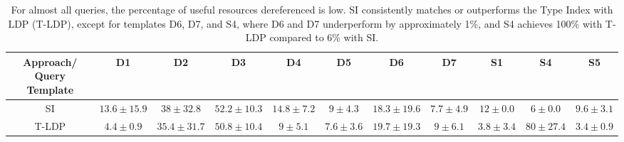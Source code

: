 \begin{table}[htbp]
	\begin{center}
		\begin{tabular}{|c|c|c|c|c|c|c|c|c|c|c|}
			\hline
            Approach/ Query Template & D1 & D2 & D3 & D4 & D5 & D6 & D7 & S1 & S4 & S5 \\
			\hline
            SI & $13.6 \pm 15.9$ & $38 \pm 32.8$ & $52.2 \pm 10.3$ & $14.8 \pm 7.2$ & $9 \pm 4.3$ & $18.3 \pm 19.6$ & $7.7 \pm 4.9$ & $12 \pm 0.0$ & $6 \pm 0.0$ & $9.6 \pm 3.1$ \\
            \hline
			T-LDP  & $4.4 \pm 0.9$ & $35.4 \pm 31.7$ & $50.8 \pm 10.4$ & $9 \pm 5.1$ & $7.6 \pm 3.6$ & $19.7 \pm 19.3$ & $9 \pm 6.1$ & $3.8 \pm 3.4$ & $80 \pm 27.4$ & $3.4 \pm 0.9$ \\
			\hline
		\end{tabular}
	\end{center}
	\caption{
        For almost all queries, the percentage of useful resources dereferenced is low. 
		SI consistently matches or outperforms the Type Index with LDP (T-LDP), except for templates D6, D7, and S4, where D6 and D7 underperform by approximately 1\%, and S4 achieves 100\% with T-LDP compared to 6\% with SI.
		}
	\label{tab:ratioUsefulResources}
\end{table}